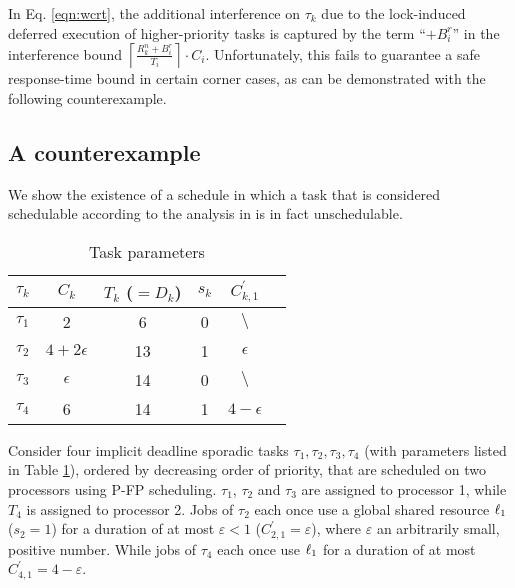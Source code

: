 In Eq. \ref{eqn:wcrt}, the additional interference on $\tau_k$ due to the lock-induced deferred execution of higher-priority tasks is captured by the term ``$+ B^r_i$'' in the interference bound  $\left \lceil \frac{R_k^n + B_i^r}{T_i} \right \rceil \cdot C_i$. Unfortunately, this fails to guarantee a safe response-time bound in certain corner cases, as can be demonstrated with the following counterexample.

\subsection{A counterexample}
\label{sec:counterexample}

We show the existence of a schedule in which a task that is considered schedulable according to the analysis in \cite{lakshmanan-2009} is in fact unschedulable.

%

\begin{table}
\centering
    \begin{tabular}{|c|c|c|c|c|c|} 
 \hline
        $\tau_k$ & $C_k$ & $T_k$ ($= D_k$) & $s_k$ & $C_{k,1}^{\prime}$\\
        \hline
        $\tau_1$ & 2             & 6  & 0 & $\setminus$\\ 
        $\tau_2$ & $4+2\epsilon$ & 13 & 1 & $\epsilon$\\
        $\tau_3$ & $\epsilon$    & 14 & 0 & $\setminus$\\
        $\tau_4$ & 6             & 14 & 1 & $4-\epsilon$\\ 
        \hline
    \end{tabular}
    \caption{Task parameters}
    \label{table:parameters}
\end{table}

Consider four implicit deadline sporadic tasks ${\tau_1, \tau_2, \tau_3, \tau_4}$ (with parameters listed in Table \ref{table:parameters}), ordered by decreasing order of priority, that are scheduled on two processors using P-FP scheduling. $\tau_1$, $\tau_2$ and $\tau_3$ are assigned to processor 1, while $T_4$ is assigned to processor 2. Jobs of $\tau_2$ each once use a global shared resource $\ell_1$  ($s_2 = 1$) for a duration of at most $\varepsilon < 1$ ($C_{2,1}^{\prime} = \varepsilon$), where $\varepsilon$ an arbitrarily small, positive number. While jobs of $\tau_4$ each once use $\ell_1$ for a duration of at most $C_{4,1}^{\prime} = 4-\varepsilon$. 

